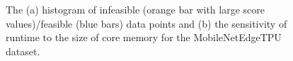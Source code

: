 \begin{figure}[t]
    \centering
    \caption{The (a) histogram of infeasible (orange bar with large score values)/feasible (blue bars) data points and (b) the sensitivity of runtime to the size of core memory for the MobileNetEdgeTPU~\citep{efficientnet:2020} dataset.} 
    \label{fig:appx_ds}
    \vspace{-0.4cm}
\end{figure}

